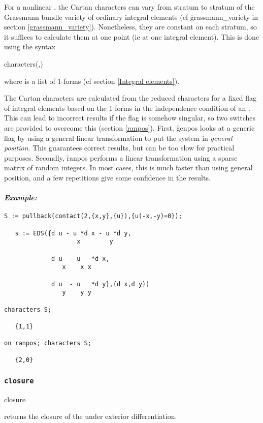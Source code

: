 For a nonlinear , the Cartan characters can vary from stratum to
stratum of the Grassmann bundle variety of ordinary integral elements (cf
\f{grassmann\_variety} in section \ref{grassmann_variety}). Nonetheless,
they are constant on each stratum, so it suffices to calculate them at one
point (ie at one integral element). This is done using the syntax
\begin{edssyntax}
	characters(,)
\end{edssyntax}
where  is a list of 1-forms (cf section
\ref{Integral elements}).

The Cartan characters are calculated from the reduced characters for a
fixed flag of integral elements based on the 1-forms in the independence
condition of an . This can lead to incorrect results if the flag
is somehow singular, so two switches are provided to overcome this (section
\ref{ranpos}). First, \f{genpos} looks at a generic flag by using a general
linear transformation to put the system in {\em general position}. This
guarantees correct results, but can be too slow for practical
purposes. Secondly, \f{ranpos} performs a linear transformation using a
sparse matrix of random integers. In most cases, this is much faster than
using general position, and a few repetitions give some confidence in the
results.

\paragraph{\it Example:}
\begin{verbatim}
S := pullback(contact(2,{x,y},{u}),{u(-x,-y)=0});

   s := EDS({d u - u *d x - u *d y,
                    x        y 

             d u  - u   *d x,
                x    x x 

             d u  - u   *d y},{d x,d y})
                y    y y

characters S;

   {1,1} 

on ranpos; characters S;

   {2,0}
\end{verbatim}

\subsubsection{\tt closure}
\label{closure}

\begin{edssyntax}
	closure 
\end{edssyntax}
returns the closure of the  under exterior differentiation. 

